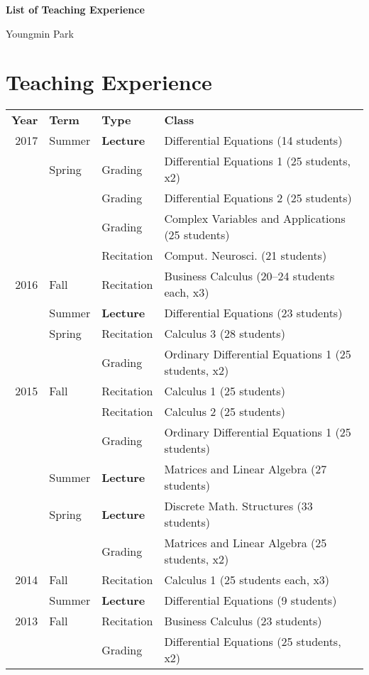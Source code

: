 \documentclass[a4paper,11pt]{article}
\begin{document}
\begin{center}
\Large \textbf{List of Teaching Experience}

\Large Youngmin Park
\end{center}

\section{Teaching Experience}

\begin{longtable}{rlll}
\textbf{Year} & \textbf{Term} & \textbf{Type} & \textbf{Class}\\
2017 & Summer& \textbf{Lecture} &  Differential Equations (14 students)\\
     & Spring & Grading &  Differential Equations 1 (25 students, x2)\\
     & & Grading & Differential Equations 2 (25 students)\\
     & & Grading & Complex Variables and Applications (25 students)\\
     & & Recitation & Comput. Neurosci. (21 students)\\
2016 & Fall & Recitation & Business Calculus (20--24 students each, x3)\\
     & Summer & \textbf{Lecture} & Differential Equations (23 students)\\
     & Spring & Recitation & Calculus 3 (28 students)\\
     & & Grading & Ordinary Differential Equations 1 (25 students, x2)\\
2015 & Fall & Recitation & Calculus 1 (25 students)\\
 &  & Recitation & Calculus 2 (25 students)\\
 &  & Grading & Ordinary Differential Equations 1 (25 students)\\
 & Summer & \textbf{Lecture} & Matrices and Linear Algebra (27 students)\\
 & Spring & \textbf{Lecture} & Discrete Math. Structures (33 students)\\
 & & Grading & Matrices and Linear Algebra (25 students, x2)\\
2014 & Fall & Recitation & Calculus 1 (25 students each, x3)\\
 & Summer & \textbf{Lecture} & Differential Equations (9 students)\\
2013 & Fall & Recitation &  Business Calculus (23 students)\\
 & & Grading & Differential Equations (25 students, x2)\\
\end{longtable}

 
\end{document}
